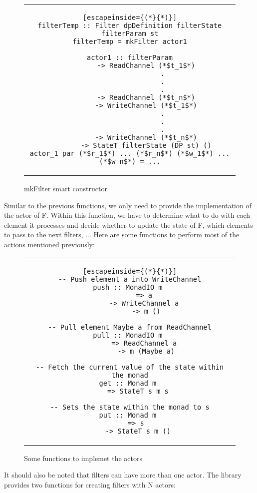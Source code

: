 \begin{figure}[H]
    \begin{tabular}{c}
        \begin{lstlisting}[escapeinside={(*}{*)}]
filterTemp :: Filter dpDefinition filterState filterParam st
filterTemp = mkFilter actor1

actor1 :: filterParam
        -> ReadChannel (*$t_1$*)
                .
                .
                .
        -> ReadChannel (*$t_n$*)
        -> WriteChannel (*$t_1$*)
                .
                .
                .
        -> WriteChannel (*$t_n$*)
        -> StateT filterState (DP st) ()
actor_1 par (*$r_1$*) ... (*$r_n$*) (*$w_1$*) ... (*$w_n$*) = ...
        \end{lstlisting}
    \end{tabular}
    \caption{mkFilter smart constructor}
    \label{fig:HC9}
\end{figure}

Similar to the previous functions, we only need to provide the implementation of the actor of F.
Within this function, we have to determine what to do with each element it processes and decide whether to update the state of F, which elements to pass to the next filters, ...
Here are some functions to perform most of the actions mentioned previously:

\begin{figure}[H]
    \begin{tabular}{c}
        \begin{lstlisting}[escapeinside={(*}{*)}]
-- Push element a into WriteChannel
push :: MonadIO m 
        => a 
        -> WriteChannel a 
        -> m ()

-- Pull element Maybe a from ReadChannel
pull :: MonadIO m 
        => ReadChannel a 
        -> m (Maybe a)

-- Fetch the current value of the state within the monad
get :: Monad m 
    => StateT s m s

-- Sets the state within the monad to s
put :: Monad m 
    => s 
    -> StateT s m ()
        \end{lstlisting}
    \end{tabular}
    \caption{Some functions to implemet the actors}
    \label{fig:HC10}
\end{figure}

It should also be noted that filters can have more than one actor.
The library provides two functions for creating filters with N actors:


